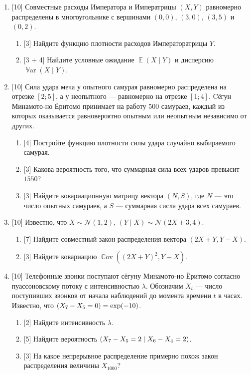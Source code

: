 \documentclass[12pt]{article}
\DeclareMathOperator{\Cov}{\mathbb{C}ov}
\DeclareMathOperator{\Var}{\mathbb{V}ar}
\let\P\relax
\DeclareMathOperator{\P}{\mathbb{P}}
\DeclareMathOperator{\E}{\mathbb{E}}
\newcommand{\cN}{\mathcal{N}}
\begin{document}
\begin{enumerate}
    \item {[10]} Совместные расходы Императора и Императрицы $(X, Y)$ равномерно распределены в многоугольнике с вершинами $(0, 0)$, $(3, 0)$, $(3, 5)$ и $(0, 2)$.
    
    \begin{enumerate}
        \item {[3]} Найдите функцию плотности расходов Императоратрицы $Y$.
        \item {[3 + 4]} Найдите условные ожидание $\E(X \mid Y)$ и дисперсию $\Var(X \mid Y)$.
    \end{enumerate}

    \item {[10]} Сила удара меча у опытного самурая равномерно распределена на отрезке $[2; 5]$,
    а у неопытного — равномерно на отрезке $[1; 4]$.
    Cёгун Минамото-но Ёритомо принимает на работу 500 самураев, каждый из которых оказывается равновероятно опытным или неопытным независимо от других. 
    
    \begin{enumerate}
        \item {[4]} Постройте функцию плотности силы удара случайно выбираемого самурая.
        \item {[3]} Какова вероятность того, что суммарная сила всех ударов превысит $1550$?
        \item {[3]} Найдите ковариационную матрицу вектора $(N, S)$, где $N$ — это число опытных самураев, а $S$ — суммарная сисла удара всех самураев.
    \end{enumerate}
    
    \item {[10]} Известно, что $X \sim \cN(1, 2)$, $(Y \mid X) \sim \cN(2X + 3, 4)$.
    \begin{enumerate}
        \item {[7]} Найдите совместный закон распределения вектора $(2X + Y, Y - X)$.
        \item {[3]} Найдите ковариацию $\Cov((2X+Y)^2, Y - X)$.
    \end{enumerate}
    
    \item {[10]} Телефонные звонки поступают сёгуну Минамото-но Ёритомо согласно пуассоновскому потоку с интенсивностью $\lambda$. 
    Обозначим $X_t$ ­— число поступивших звонков от начала наблюдений до момента времени $t$ в часах.
    Известно, что $\P(X_7 - X_5 = 0) = \exp(-10)$.
    \begin{enumerate}
        \item {[2]} Найдите интенсивность $\lambda$. 
        \item {[5]} Найдите вероятность $\P(X_7 - X_5 = 2 \mid X_6 - X_4 = 2)$.
        \item {[3]} На какое непрерывное распределение примерно похож закон распределения величины $X_{1000}$?
    \end{enumerate}
        

\end{enumerate}
\end{document}
